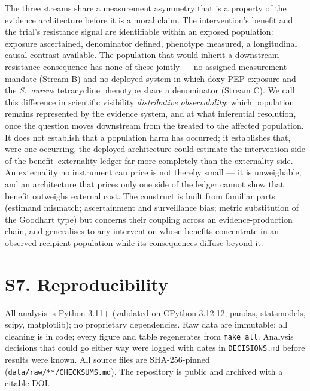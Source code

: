 \documentclass[11pt,a4paper]{article}
\newcommand{\sa}{\emph{S.~aureus}}
\begin{document}
The three streams share a measurement asymmetry that is a property of the
evidence architecture before it is a moral claim. The intervention's benefit and
the trial's resistance signal are identifiable within an exposed population:
exposure ascertained, denominator defined, phenotype measured, a longitudinal
causal contrast available. The population that would inherit a downstream
resistance consequence has none of these jointly --- no assigned measurement
mandate (Stream B) and no deployed system in which doxy-PEP exposure and the
\sa{} tetracycline phenotype share a denominator (Stream C). We call this
difference in scientific visibility \emph{distributive observability}: which
population remains represented by the evidence system, and at what inferential
resolution, once the question moves downstream from the treated to the affected
population. It does not establish that a population harm has occurred; it
establishes that, were one occurring, the deployed architecture could estimate the
intervention side of the benefit--externality ledger far more completely than the
externality side. An externality no instrument can price is not thereby small ---
it is unweighable, and an architecture that prices only one side of the ledger
cannot show that benefit outweighs external cost. The construct is built from
familiar parts (estimand mismatch; ascertainment and surveillance bias;
metric substitution of the Goodhart type) but concerns their coupling across an
evidence-production chain, and generalises to any intervention whose benefits
concentrate in an observed recipient population while its consequences diffuse
beyond it.

\section*{S7. Reproducibility}

All analysis is Python 3.11+ (validated on CPython 3.12.12; pandas, statsmodels, scipy, matplotlib); no
proprietary dependencies. Raw data are immutable; all cleaning is in code; every
figure and table regenerates from \texttt{make all}. Analysis decisions that could
go either way were logged with dates in \texttt{DECISIONS.md} before results were
known. All source files are SHA-256-pinned (\texttt{data/raw/**/CHECKSUMS.md}).
The repository is public and archived with a citable DOI.
\end{document}
